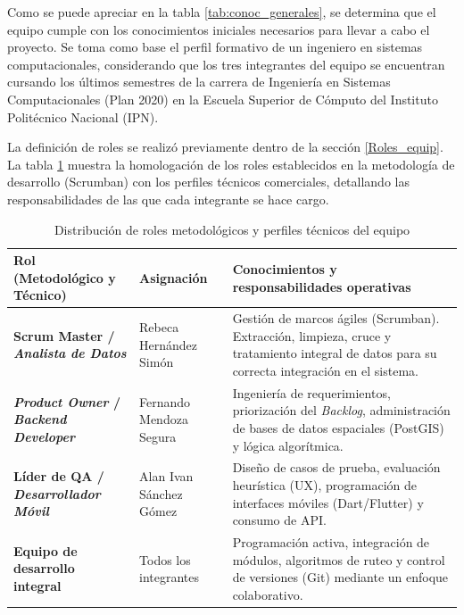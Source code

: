 Como se puede apreciar en la tabla \ref{tab:conoc_generales}, se determina que el equipo cumple con los conocimientos iniciales necesarios para llevar a cabo el proyecto. Se toma como base el perfil formativo de un ingeniero en sistemas computacionales, considerando que los tres integrantes del equipo se encuentran cursando los últimos semestres de la carrera de Ingeniería en Sistemas Computacionales (Plan 2020) en la Escuela Superior de Cómputo del Instituto Politécnico Nacional (IPN).

La definición de roles se realizó previamente dentro de la sección \ref{Roles_equip}. La tabla \ref{tab:roles_conocimientos} muestra la homologación de los roles establecidos en la metodología de desarrollo (Scrumban) con los perfiles técnicos comerciales, detallando las responsabilidades de las que cada integrante se hace cargo.

\begin{table}[htbp]
\centering
\footnotesize
\caption{Distribución de roles metodológicos y perfiles técnicos del equipo}
\label{tab:roles_conocimientos}
\begin{tabular}{| >{\centering\arraybackslash}m{} | >{\centering\arraybackslash}m{} | >{\centering\arraybackslash}m{} |}
\hline
\textbf{Rol (Metodológico y Técnico)} & \textbf{Asignación} & \textbf{Conocimientos y responsabilidades operativas} \\ \hline

\textbf{Scrum Master / \textit{Analista de Datos}} & Rebeca Hernández Simón & Gestión de marcos ágiles (Scrumban). Extracción, limpieza, cruce y tratamiento integral de datos para su correcta integración en el sistema. \\ \hline

\textbf{\textit{Product Owner} / \textit{Backend Developer}} & Fernando Mendoza Segura & Ingeniería de requerimientos, priorización del \textit{Backlog}, administración de bases de datos espaciales (PostGIS) y lógica algorítmica. \\ \hline

\textbf{Líder de QA / \textit{Desarrollador Móvil}} & Alan Ivan Sánchez Gómez & Diseño de casos de prueba, evaluación heurística (UX), programación de interfaces móviles (Dart/Flutter) y consumo de API. \\ \hline

\textbf{Equipo de desarrollo integral} & Todos los integrantes & Programación activa, integración de módulos, algoritmos de ruteo y control de versiones (Git) mediante un enfoque colaborativo. \\ \hline
\end{tabular}
\end{table}

